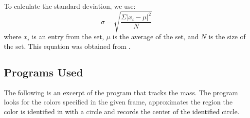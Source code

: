 \documentclass[11pt]{article}
\begin{document}
        To calculate the standard deviation, we use:
        \begin{equation}
            \sigma = \sqrt{\frac{\Sigma|x_i - \mu|^{2}}{N}}
            \label{eq:stdev}
        \end{equation}
        where $x_i$ is an entry from the set, $\mu$ is the average of the set, and $N$ is the size of the set. This equation was obtained from \cite{khan_2020}.

        \subsection{Programs Used}
            The following is an excerpt of the program that tracks the mass. The program looks for the colors specified in the given frame, approximates the region the color is identified in with a circle and records the center of the identified circle.
\end{document}
